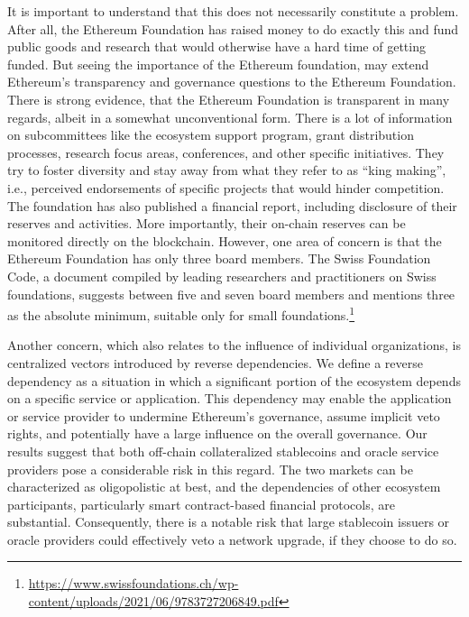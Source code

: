 \documentclass[No]{AEA}
\begin{document}
It is important to understand that this does not necessarily constitute a problem. After all, the Ethereum Foundation has raised money to do exactly this and fund public goods and research that would otherwise have a hard time of getting funded. 		
But seeing the importance of the Ethereum foundation, may extend Ethereum's transparency and governance questions to the Ethereum Foundation.
There is strong evidence, that the Ethereum Foundation is transparent in many regards, albeit in a somewhat unconventional form. There is a lot of information on subcommittees like the ecosystem support program, grant distribution processes, research focus areas, conferences, and other specific initiatives. They try to foster diversity and stay away from what they refer to as ``king making'', i.e., perceived endorsements of specific projects that would hinder competition. 
The foundation has also published a financial report, including disclosure of their reserves and activities. More importantly, their on-chain reserves can be monitored directly on the blockchain. 
However, one area of concern is that the Ethereum Foundation has only three board members. The Swiss Foundation Code, a document compiled by leading researchers and practitioners on Swiss foundations, suggests between five and seven board members and mentions three as the absolute minimum, suitable only for small foundations.\footnote{\url{https://www.swissfoundations.ch/wp-content/uploads/2021/06/9783727206849.pdf}} 
 
Another concern, which also relates to the influence of individual organizations, is centralized vectors introduced by reverse dependencies. We define a reverse dependency as a situation in which a significant portion of the ecosystem depends on a specific service or application. This dependency may enable the application or service provider to undermine Ethereum's governance, assume implicit veto rights, and potentially have a large influence on the overall governance.
Our results suggest that both off-chain collateralized stablecoins and oracle service providers pose a considerable risk in this regard. The two markets can be characterized as oligopolistic at best, and the dependencies of other ecosystem participants, particularly smart contract-based financial protocols, are substantial. Consequently, there is a notable risk that large stablecoin issuers or oracle providers could effectively veto a network upgrade, if they choose to do so.
	
\end{document}

